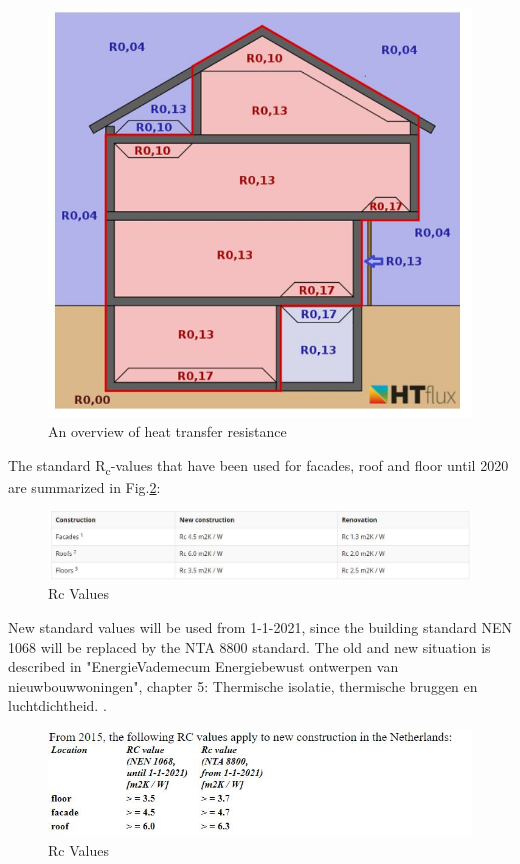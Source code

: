 \begin{figure}[H]
	\centering
	\includegraphics[width=0.8\columnwidth]{Pictures/Overview of heat resistances.JPG}
	\caption[Short title]{An overview of heat transfer resistance\cite{SURFREST}}
	\label{fig:overview}
\end{figure}


The standard R\textsubscript{c}-values that have been used for facades, roof and floor until 2020 are summarized in Fig.\ref{fig:Rcvalues}:

\begin{figure}[H]
	\centering
	\includegraphics[width=1.0\columnwidth]{Pictures/Rc_values_2020.JPG}
	\caption[Short title]{Rc Values \cite{ISOL}}
	\label{fig:Rcvalues}
\end{figure}

New standard values will be used from 1-1-2021, since the building standard NEN 1068 will be replaced by the NTA 8800 standard. The old and new situation is described in "EnergieVademecum Energiebewust ontwerpen van nieuwbouwwoningen", chapter 5: Thermische isolatie, thermische bruggen en luchtdichtheid.
\cite{ISSO}.

\begin{figure}[H]
	\centering
	\includegraphics[width=1.0\columnwidth]{Pictures/Rc_values_2021.JPG}
	\caption[Short title]{Rc Values \cite{RVALUE}}
	\label{fig:newRc}
\end{figure}

